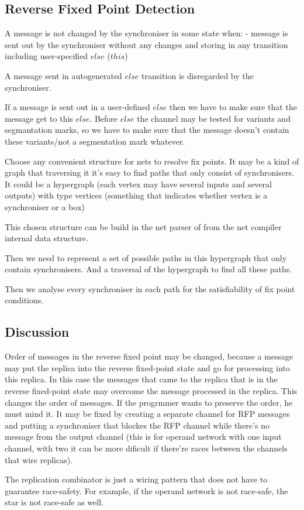     \subsection{Reverse Fixed Point Detection\label{rfp_detect}}
A message is not changed by the synchroniser in some state when:
- message is sent out by the synchroniser without any changes and storing in any transition including user-specified $else$ ($this$)

A message sent in autogenerated $else$ transition is disregarded by the synchroniser.

If a message is sent out in a user-defined $else$ then we have to make sure that the message get to this $else$. Before $else$ the channel may be tested for variants and segmantation marks, so we have to make sure that the message doesn't contain these variants/not a segmentation mark whatever.


Choose any convenient structure for nets to resolve fix points. It may be a kind of graph that traversing it it's easy to find paths that only consist of synchronisers.
It could be a hypergraph (each vertex may have several inputs and several outputs) with type vertices (something that indicates whether vertex is a synchroniser or a box)

This chosen structure can be build in the net parser of from the net compiler internal data structure.

Then we need to represent a set of possible paths in this hypergraph that only contain synchronisers. And a traversal of the hypergraph to find all these paths.

Then we analyse every synchroniser in each path for the satisfiability of fix point conditions.


    \subsection{Discussion}
Order of messages in the reverse fixed point may be changed, because a message may put the replica into the reverse fixed-point state and go for processing into this replica. In this case the messages that came to the replica that is in the reverse fixed-point state may overcome the message processed in the replica. This changes the order of messages. If the progrmmer wants to preserve the order, he must mind it. It may be fixed by creating a separate channel for RFP messages and putting a synchroniser that blockes the RFP channel while there's no message from the output channel (this is for operand network with one input channel, with two it can be more dificult if there're races between the channels that wire replicas).

The replication combinator is just a wiring pattern that does not have to guarantee race-safety. For example, if the operand network is not race-safe, the star is not race-safe as well.


